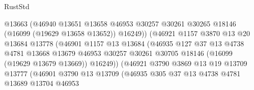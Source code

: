 \begin{lexlean}{RustStd}
\begin{coremodule}
                                    @13663
                                    (@46940
                                      @13651
                                      @13658
                                      @46953
                                      @30257
                                      @30261
                                      @30265
                                      @18146
                                      (@16099 (@19629 @13658 @13652))
                                      @16249))
                                  (@46921
                                    @1157
                                    @3870
                                    @13
                                    @20
                                    @13684
                                    @13778
                                    (@46901
                                      @1157
                                      @13
                                      @13684
                                      (@46935
                                        @127
                                        @37
                                        @13
                                        @4738
                                        @4781
                                        @13668
                                        @13679
                                        @46953
                                        @30257
                                        @30261
                                        @30705
                                        @18146
                                        (@16099 (@19629 @13679 @13669))
                                        @16249))
                                    (@46921
                                      @3790
                                      @3869
                                      @13
                                      @19
                                      @13709
                                      @13777
                                      (@46901
                                        @3790
                                        @13
                                        @13709
                                        (@46935
                                          @305
                                          @37
                                          @13
                                          @4738
                                          @4781
                                          @13689
                                          @13704
                                          @46953

\end{coremodule}
\end{lexlean}
